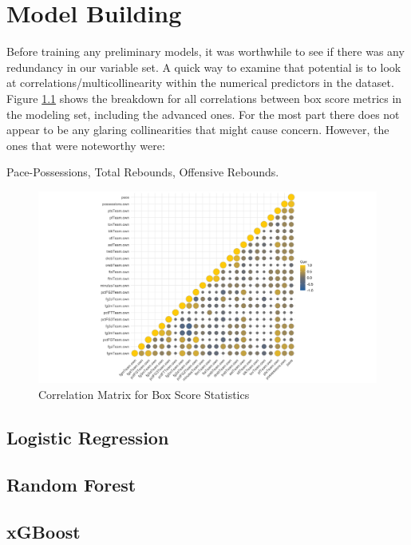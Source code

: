 \documentclass [MS] {uclathes}
\begin{document}
\chapter{Model Building}

Before training any preliminary models, it was worthwhile to see if there was any redundancy in our variable set. A quick way to examine that potential is to look at correlations/multicollinearity within the numerical predictors in the dataset. Figure \ref{fig:corrs} shows the breakdown for all correlations between box score metrics in the modeling set, including the advanced ones. For the most part there does not appear to be any glaring collinearities that might cause concern. However, the ones that were noteworthy were:

Pace-Possessions, Total Rebounds, Offensive Rebounds.

\begin{figure}[h]
\centering
  \includegraphics[width=500px]{corrs_plot.png}
  \caption{Correlation Matrix for Box Score Statistics}
  \label{fig:corrs}
\end{figure}


\section{Logistic Regression}

\section{Random Forest}

\section{xGBoost}
\end{document}
